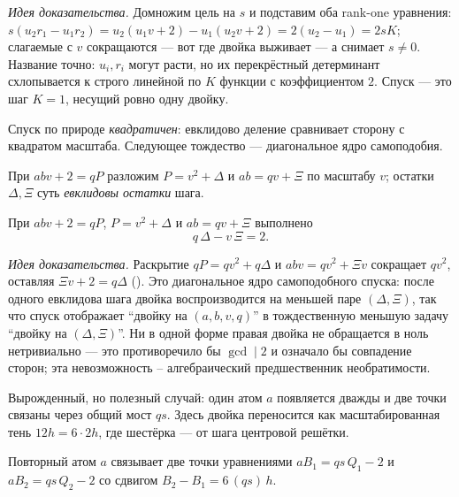 \emph{Идея доказательства.} Домножим цель на $s$ и подставим оба rank-one уравнения:
$s(u_2 r_1-u_1 r_2)=u_2(u_1 v+2)-u_1(u_2 v+2)=2(u_2-u_1)=2sK$; слагаемые с $v$ сокращаются --- вот
где двойка выживает --- а  снимает $s\ne 0$. Название точно:
$u_i,r_i$ могут расти, но их перекрёстный детерминант схлопывается к строго линейной по $K$
функции с коэффициентом $2$. Спуск --- это шаг $K=1$, несущий ровно одну двойку.

Спуск по природе \emph{квадратичен}: евклидово деление сравнивает сторону с квадратом масштаба.
Следующее тождество --- диагональное ядро самоподобия.

\begin{definition}\label{def:euclid-decomp}
При $abv+2=qP$ разложим $P=v^2+\Delta$ и $ab=qv+\Xi$ по масштабу $v$; остатки $\Delta,\Xi$ суть
\emph{евклидовы остатки} шага.
\end{definition}

\begin{theorem}\label{thm:euclid_descent_identity}
\green{} При $abv+2=qP$, $P=v^2+\Delta$ и $ab=qv+\Xi$ выполнено
\begin{equation}\label{eq:euclid-descent}
q\,\Delta-v\,\Xi=2.
\end{equation}
\end{theorem}

\emph{Идея доказательства.} Раскрытие $qP=qv^2+q\Delta$ и $abv=qv^2+\Xi v$ сокращает $qv^2$,
оставляя $\Xi v+2=q\Delta$ (). Это диагональное ядро
самоподобного спуска: после одного евклидова шага двойка воспроизводится на меньшей паре
$(\Delta,\Xi)$, так что спуск отображает ``двойку на $(a,b,v,q)$'' в тождественную меньшую задачу
``двойку на $(\Delta,\Xi)$''. Ни в одной форме правая двойка не обращается в ноль нетривиально ---
это противоречило бы $\gcd\mid 2$ и означало бы совпадение сторон; эта невозможность --
алгебраический предшественник необратимости.

Вырожденный, но полезный случай: один атом $a$ появляется дважды и две точки связаны через общий
мост $qs$. Здесь двойка переносится как масштабированная тень $12h=6\cdot 2h$, где шестёрка --- от
шага центровой решётки.

\begin{definition}\label{def:bridge}
Повторный атом $a$ связывает две точки уравнениями $a B_1=qs\,Q_1-2$ и $a B_2=qs\,Q_2-2$ со сдвигом
$B_2-B_1=6\,(qs)\,h$.
\end{definition}

